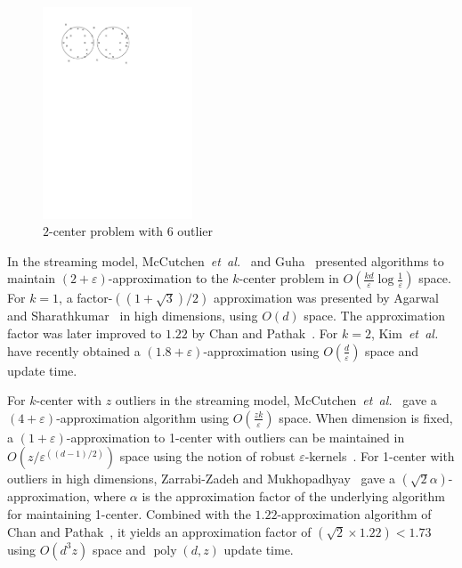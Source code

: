 \documentclass[envcountsame]{cls/cccg15}
\renewcommand{\O}{\ensuremath{{O}}}
\newcommand{\poly}{\mathop{\mathrm{poly}}}
\newcommand{\eps}{\varepsilon}
\newcommand{\etal}{{\em et~al.\/}}
\begin{document}
\begin{figure}[t]
	\centering
	\includegraphics[width=12em]{figs/definition}
	\caption{$2$-center problem with 6 outlier}
	\label{fig:definition}
\end{figure}

In the streaming model, McCutchen~\etal~\cite{mccutchen2008streaming} 
and Guha~\cite{guha2009tight} presented algorithms to maintain $(2+\eps)$-approximation 
to the $k$-center problem in %
$\O(\frac{kd}{\eps} \log \frac{1}{\eps})$ space.
For $k=1$, %
a factor-$((1+\sqrt{3})/{2})$ approximation 
was presented by Agarwal and Sharathkumar~\cite{agarwal2010streaming} 
in high dimensions, using $O(d)$ space. 
The approximation factor was later improved 
to $1.22$ by Chan and Pathak~\cite{chan2014streaming}.
For $k=2$, Kim~\etal~\cite{kim2014improved} 
have recently obtained a $(1.8+\eps)$-approximation  
using $\O(\frac{d}{\eps})$ space and update time.

For $k$-center with $z$ outliers in the streaming model, 
McCutchen~\etal~\cite{mccutchen2008streaming} 
gave a $(4+\eps)$-approximation 
algorithm using $\O(\frac{zk}{\eps})$ space.
When dimension is fixed, a $(1 + \eps)$-approximation to 1-center with outliers
can be maintained in $\O({z}/{\eps^{((d-1)/2)}})$ space 
using the notion of robust $\eps$-kernels~\cite{agarwal2007space, zarrabi2011almost}.
For 1-center with outliers in high dimensions, 
Zarrabi-Zadeh and Mukhopadhyay~\cite{zarrabi2009streaming} 
gave a $(\sqrt{2}\alpha)$-approximation, 
where $\alpha$ is the approximation factor of the underlying algorithm for maintaining 1-center. 
Combined with the $1.22$-approximation algorithm of Chan and Pathak~\cite{chan2014streaming},
it yields an approximation factor of $(\sqrt{2} \times 1.22) < 1.73$ 
using $O(d^3z)$ space and $\poly(d,z)$ update time.
\end{document}
